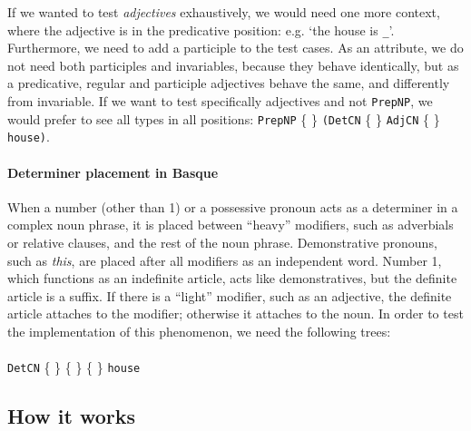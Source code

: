 \documentclass[11pt]{article}
\def\t#1{\texttt{#1}}
\newcommand{\tts}[1]{{\tt #1}}
\begin{document}
If we wanted to test \emph{adjectives} exhaustively, we would need one more context, where
the adjective is in the predicative position: e.g. `the house is \verb|_|'.
Furthermore, we need to add a participle to the test cases.
As an attribute, we do not need both participles and invariables,
because they behave identically, but as a predicative, regular and
participle adjectives behave the same, and differently from
invariable. If we want to test specifically adjectives and not
\t{PrepNP}, we would prefer to see all types in all positions:
 \t{PrepNP} \{  \}
             {\tt (DetCN} \{  \} 
             {\tt AdjCN}  \{ \} 
             {\tt house)}.

\paragraph{Determiner placement in Basque} When a number (other than 1) or a
possessive pronoun acts as a determiner in a complex noun phrase, it
is placed between ``heavy'' modifiers, such as adverbials or relative clauses,
and the rest of the noun phrase. Demonstrative pronouns, such as \emph{this}, 
 are placed after all modifiers as an independent word. Number 1,
 which functions as an indefinite article, acts like demonstratives, but
 the definite article is a suffix. If there is a ``light'' modifier,
 such as an adjective, the definite article attaches to the modifier;
 otherwise it attaches to the noun. In order to test the
 implementation of this phenomenon, we need the following trees: \\ \\ 
\t{DetCN} \{
\stackanchor{\stackanchor{}{\tts{the}}}{\stackanchor{\tts{this}}{\tts{your}}}
\} \{  \} 
\{  \}  {\tt house} 


\subsection{How it works}
\end{document}
